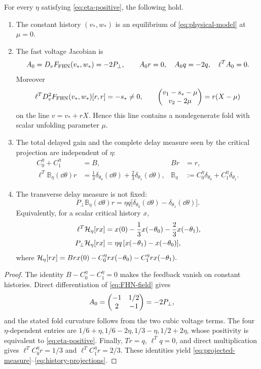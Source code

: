\begin{proposition}
\label{prop:fixed-measure}
For every \(\eta\) satisfying \cref{eq:eta-positive}, the following hold.
\begin{enumerate}[label=\textup{(\roman*)}]
\item The constant history \((v_*,w_*)\) is an equilibrium of
      \cref{eq:physical-model} at \(\mu=0\).
\item The fast voltage Jacobian is
\[
 A_0=D_vF_{\rm FHN}(v_*,w_*)=-2P_\perp,\qquad
 A_0r=0,\quad A_0q=-2q,\quad \ell^TA_0=0.
\]
Moreover
\[
 \ell^TD_v^2F_{\rm FHN}(v_*,w_*)[r,r]=-s_*\ne0,\qquad
 \begin{pmatrix}v_1-s_*-\mu\\v_2-2\mu\end{pmatrix}=r(X-\mu)
\]
on the line \(v=v_*+rX\).  Hence this line contains a nondegenerate fold
with scalar unfolding parameter \(\mu\).
\item The total delayed gain and the complete delay measure seen by the
critical projection are independent of \(\eta\):
\begin{align}
 C_0^\eta+C_1^\eta&=B, & Br&=r,
 \label{eq:total-gain}\\
 \ell^T\mathbb B_\eta(\dd\theta)r
 &=\frac13\delta_{\theta_0}(\dd\theta)
   +\frac23\delta_{\theta_1}(\dd\theta),
 &
 \mathbb B_\eta&:=C_0^\eta\delta_{\theta_0}
                  +C_1^\eta\delta_{\theta_1}.
 \label{eq:projected-measure}
\end{align}
\item The transverse delay measure is not fixed:
\begin{equation}
\label{eq:transverse-measure}
 P_\perp\mathbb B_\eta(\dd\theta)r
 =\eta q\bigl[\delta_{\theta_0}(\dd\theta)
               -\delta_{\theta_1}(\dd\theta)\bigr].
\end{equation}
Equivalently, for a scalar critical history \(x\),
\begin{equation}
\label{eq:history-projections}
\begin{aligned}
 \ell^T\mathcal H_\eta[rx]
 &=x(0)-\frac13x(-\theta_0)-\frac23x(-\theta_1),\\
 P_\perp\mathcal H_\eta[rx]
 &=\eta q\,[x(-\theta_1)-x(-\theta_0)],
\end{aligned}
\end{equation}
where
\(
 \mathcal H_\eta[rx]=Brx(0)-C_0^\eta r x(-\theta_0)
                         -C_1^\eta r x(-\theta_1).
\)
\end{enumerate}
\end{proposition}

\begin{proof}
The identity \(B-C_0^\eta-C_1^\eta=0\) makes the feedback vanish on
constant histories.  Direct differentiation of \cref{eq:FHN-field} gives
\[
 A_0=\begin{pmatrix}-1&1/2\\2&-1\end{pmatrix}=-2P_\perp,
\]
and the stated fold curvature follows from the two cubic voltage terms.
The four \(\eta\)-dependent entries are
\(
1/6+\eta,1/6-2\eta,1/3-\eta,1/2+2\eta
\), whose positivity is equivalent to \cref{eq:eta-positive}.
Finally, \(Tr=q\), \(\ell^Tq=0\), and direct multiplication gives
\(
 \ell^TC_0^\eta r=1/3
\) and
\(
 \ell^TC_1^\eta r=2/3
\).
These identities yield \cref{eq:projected-measure}--\cref{eq:history-projections}.
\end{proof}

